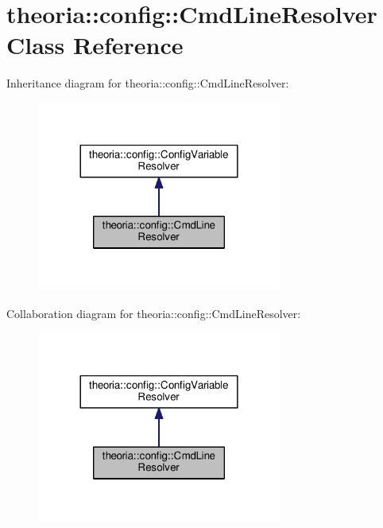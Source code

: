 \hypertarget{classtheoria_1_1config_1_1CmdLineResolver}{\section{theoria\+:\+:config\+:\+:Cmd\+Line\+Resolver Class Reference}
\label{classtheoria_1_1config_1_1CmdLineResolver}
}


Inheritance diagram for theoria\+:\+:config\+:\+:Cmd\+Line\+Resolver\+:
\nopagebreak
\begin{figure}[H]
\begin{center}
\leavevmode
\includegraphics[width=228pt]{classtheoria_1_1config_1_1CmdLineResolver__inherit__graph}
\end{center}
\end{figure}


Collaboration diagram for theoria\+:\+:config\+:\+:Cmd\+Line\+Resolver\+:
\nopagebreak
\begin{figure}[H]
\begin{center}
\leavevmode
\includegraphics[width=228pt]{classtheoria_1_1config_1_1CmdLineResolver__coll__graph}
\end{center}
\end{figure}
